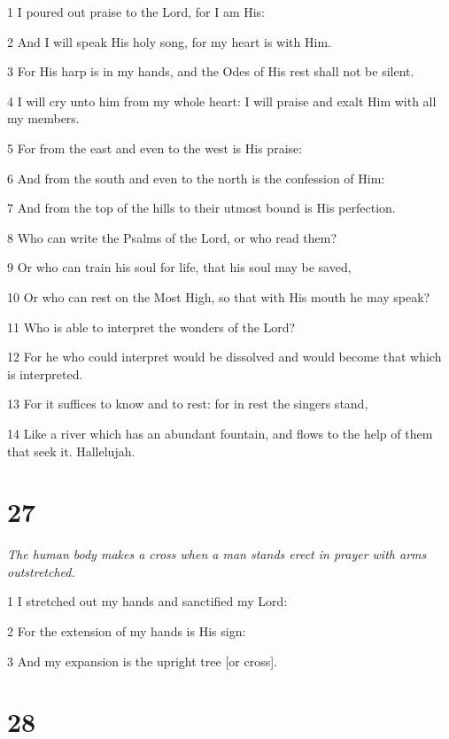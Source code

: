 \par 1 I poured out praise to the Lord, for I am His:
\par 2 And I will speak His holy song, for my heart is with Him.
\par 3 For His harp is in my hands, and the Odes of His rest shall not be silent.
\par 4 I will cry unto him from my whole heart: I will praise and exalt Him with all my members.
\par 5 For from the east and even to the west is His praise:
\par 6 And from the south and even to the north is the confession of Him:
\par 7 And from the top of the hills to their utmost bound is His perfection.
\par 8 Who can write the Psalms of the Lord, or who read them?
\par 9 Or who can train his soul for life, that his soul may be saved,
\par 10 Or who can rest on the Most High, so that with His mouth he may speak?
\par 11 Who is able to interpret the wonders of the Lord?
\par 12 For he who could interpret would be dissolved and would become that which is interpreted.
\par 13 For it suffices to know and to rest: for in rest the singers stand,
\par 14 Like a river which has an abundant fountain, and flows to the help of them that seek it. Hallelujah.

\chapter{27}

\par \textit{The human body makes a cross when a man stands erect in prayer with arms outstretched.}

\par 1 I stretched out my hands and sanctified my Lord:
\par 2 For the extension of my hands is His sign:
\par 3 And my expansion is the upright tree [or cross].



\chapter{28}

